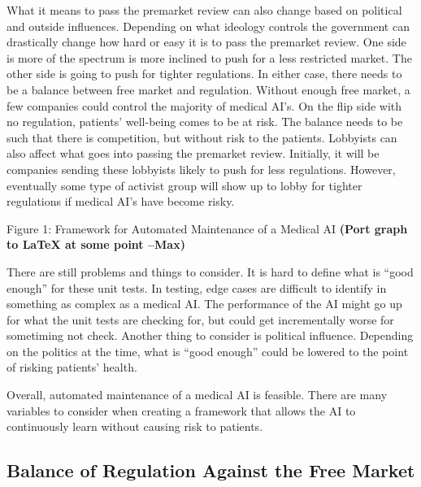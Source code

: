 \documentclass[]{article}
\begin{document}
			What it means to pass the premarket review can also change based on political and outside influences. Depending on what ideology controls the government can drastically change how hard or easy it is to pass the premarket review. One side is more of the spectrum is more inclined to push for a less restricted market. The other side is going to push for tighter regulations. In either case, there needs to be a balance between free market and regulation. Without enough free market, a few companies could control the majority of medical AI’s. On the flip side with no regulation, patients’ well-being comes to be at risk. The balance needs to be such that there is competition, but without risk to the patients. Lobbyists can also affect what goes into passing the premarket review. Initially, it will be companies sending these lobbyists likely to push for less regulations. However, eventually some type of activist group will show up to lobby for tighter regulations if medical AI’s have become risky.

			Figure 1: Framework for Automated Maintenance of a Medical AI \textbf{(Port graph to LaTeX at some point --Max)}

			There are still problems and things to consider. It is hard to define what is “good enough” for these unit tests. In testing, edge cases are difficult to identify in something as complex as a medical AI. The performance of the AI might go up for what the unit tests are checking for, but could get incrementally worse for sometiming not check. Another thing to consider is political influence. Depending on the politics at the time, what is “good enough” could be lowered to the point of risking patients’ health.
		
			Overall, automated maintenance of a medical AI is feasible. There are many variables to consider when creating a framework that allows the AI to continuously learn without causing risk to patients. 

		\subsection{Balance of Regulation Against the Free Market}\label{market}

			
\medskip



		
\end{document}
